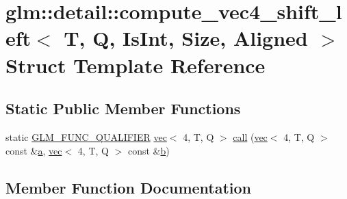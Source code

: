 \hypertarget{structglm_1_1detail_1_1compute__vec4__shift__left}{}\section{glm\+:\+:detail\+:\+:compute\+\_\+vec4\+\_\+shift\+\_\+left$<$ T, Q, Is\+Int, Size, Aligned $>$ Struct Template Reference}
\label{structglm_1_1detail_1_1compute__vec4__shift__left}
\subsection*{Static Public Member Functions}
\begin{DoxyCompactItemize}
\item 
static \hyperlink{setup_8hpp_a33fdea6f91c5f834105f7415e2a64407}{G\+L\+M\+\_\+\+F\+U\+N\+C\+\_\+\+Q\+U\+A\+L\+I\+F\+I\+ER} \hyperlink{structglm_1_1vec}{vec}$<$ 4, T, Q $>$ \hyperlink{structglm_1_1detail_1_1compute__vec4__shift__left_a2a88686231e04bbb8855908e3655a2dc}{call} (\hyperlink{structglm_1_1vec}{vec}$<$ 4, T, Q $>$ const \&\hyperlink{_s_d_l__opengl__glext_8h_a3309789fc188587d666cda5ece79cf82}{a}, \hyperlink{structglm_1_1vec}{vec}$<$ 4, T, Q $>$ const \&\hyperlink{_s_d_l__opengl__glext_8h_a0f71581a41fd2264c8944126dabbd010}{b})
\end{DoxyCompactItemize}


\subsection{Member Function Documentation}
\mbox{\label{structglm_1_1detail_1_1compute__vec4__shift__left_a2a88686231e04bbb8855908e3655a2dc}} 
